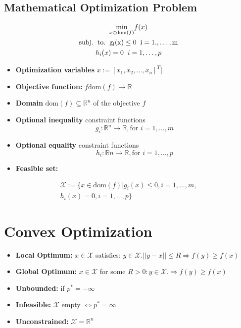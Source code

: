 \subsection{Mathematical Optimization Problem}
\begin{gather*}
 \underset{x\in \mathrm{dom}(f)}{\mathrm{min}} f(x)\\
 \mathrm{subj. \hspace{2mm} to. \hspace{2mm} g_i(x) \leq 0 \hspace{2mm} i = 1.,\dots,m}\\
 h_i(x) = 0 \hspace{2mm} i = 1,\dots , p
\end{gather*}
\begin{itemize}
    \item \textbf{Optimization variables} $x:= [x_1, x_2,\dots, x_n]^T]$
    \item \textbf{Objective function:} $f \mathrm{dom}(f) \rightarrow \mathbb{R}$
    \item \textbf{Domain} $\mathrm{dom}(f) \subseteq \mathbb{R}^n$ of the objective $f$
    \item \textbf{Optional inequality} constraint functions \[g_i : \mathbb{R}^n \rightarrow \mathbb{R}, \textrm{for } i =1,\dots,m\]
    \item \textbf{Optional equality} constraint functions \[h_i: \mathbb{R}n \rightarrow \mathbb{R}, \textrm{for } i = 1,\dots, p\]
    \item  \textbf{Feasible set:}
\end{itemize}
    {\small\begin{gather*}\mathcal{X} := \{x\in \textrm{dom}(f) | g_i(x) \leq 0,i=1,\dots,m,\\ h_i(x)=0, i =1,\dots,p \} \end{gather*}}
 \vfill\null\columnbreak
\section{Convex Optimization}
\begin{itemize}
    \item \textbf{Local Optimum:} $x \in \mathcal{X}$ satisfies: $y \in \mathcal{X}. ||y-x|| \leq R \Rightarrow f(y) \geq f(x)$
    \item \textbf{Global Optimum:} $x \in \mathcal{X}$ for some $R > 0: y \in \mathcal{X}. \Rightarrow f(y) \geq f(x)$ 
    \item \textbf{Unbounded:} if $p^* = -\infty$
    \item \textbf{Infeasible:} $\mathcal{X}$ empty $\Leftrightarrow p^* = \infty$
    \item \textbf{Unconstrained:} $\mathcal{X} = \mathbb{R}^n$
\end{itemize}

